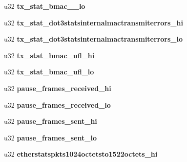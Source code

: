 \begin{DoxyCompactItemize}
\item 
\hypertarget{structbnx2x__eth__stats_a60eedb34e3d1a02b4c682664ff92443d}{
u32 {\bfseries tx\_\-stat\_\-bmac\_\_\-lo}}
\label{structbnx2x__eth__stats_a60eedb34e3d1a02b4c682664ff92443d}

\item 
\hypertarget{structbnx2x__eth__stats_a69b1a396e372638412c16b12c4202787}{
u32 {\bfseries tx\_\-stat\_\-dot3statsinternalmactransmiterrors\_\-hi}}
\label{structbnx2x__eth__stats_a69b1a396e372638412c16b12c4202787}

\item 
\hypertarget{structbnx2x__eth__stats_ae6e6eec8cb65f866a292914c422bcc22}{
u32 {\bfseries tx\_\-stat\_\-dot3statsinternalmactransmiterrors\_\-lo}}
\label{structbnx2x__eth__stats_ae6e6eec8cb65f866a292914c422bcc22}

\item 
\hypertarget{structbnx2x__eth__stats_aa06b3416478d18f811b7a61ad5469f7a}{
u32 {\bfseries tx\_\-stat\_\-bmac\_\-ufl\_\-hi}}
\label{structbnx2x__eth__stats_aa06b3416478d18f811b7a61ad5469f7a}

\item 
\hypertarget{structbnx2x__eth__stats_a87164c9ab69984717aaaa63a8bec5a17}{
u32 {\bfseries tx\_\-stat\_\-bmac\_\-ufl\_\-lo}}
\label{structbnx2x__eth__stats_a87164c9ab69984717aaaa63a8bec5a17}

\item 
\hypertarget{structbnx2x__eth__stats_a6c9b3a8d0682d1186c4e865d70d8cfa4}{
u32 {\bfseries pause\_\-frames\_\-received\_\-hi}}
\label{structbnx2x__eth__stats_a6c9b3a8d0682d1186c4e865d70d8cfa4}

\item 
\hypertarget{structbnx2x__eth__stats_a894f401658a29f489b2a22f475fd653d}{
u32 {\bfseries pause\_\-frames\_\-received\_\-lo}}
\label{structbnx2x__eth__stats_a894f401658a29f489b2a22f475fd653d}

\item 
\hypertarget{structbnx2x__eth__stats_aad722b2f00dc602b2ab789dcb3fa2966}{
u32 {\bfseries pause\_\-frames\_\-sent\_\-hi}}
\label{structbnx2x__eth__stats_aad722b2f00dc602b2ab789dcb3fa2966}

\item 
\hypertarget{structbnx2x__eth__stats_a54167377f859e51365a79afe1dd23fc4}{
u32 {\bfseries pause\_\-frames\_\-sent\_\-lo}}
\label{structbnx2x__eth__stats_a54167377f859e51365a79afe1dd23fc4}

\item 
\hypertarget{structbnx2x__eth__stats_ad1d9498f4f51dac33dbc7285141cf28b}{
u32 {\bfseries etherstatspkts1024octetsto1522octets\_\-hi}}
\label{structbnx2x__eth__stats_ad1d9498f4f51dac33dbc7285141cf28b}


\end{DoxyCompactItemize}
